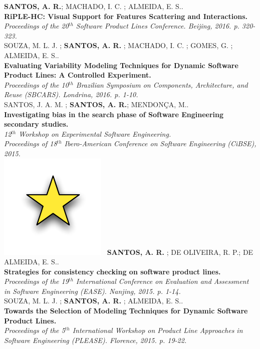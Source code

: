 \documentclass[]{friggeri-cv}
\begin{document}
\textbf{SANTOS, A. R.}; MACHADO, I. C. ; ALMEIDA, E. S..\\
\textbf{RiPLE-HC: Visual Support for Features Scattering and Interactions.} \\
\emph{Proceedings of the 20$^{th}$ Software Product Lines Conference. Beijing, 2016. p. 320-323.}\\

SOUZA, M. L. J. ; \textbf{SANTOS, A. R.} ; MACHADO, I. C. ; GOMES, G. ; ALMEIDA, E. S..\\
\textbf{Evaluating Variability Modeling Techniques for Dynamic Software Product Lines: A Controlled Experiment.} \\
\emph{Proceedings of the 10$^{th}$ Brazilian Symposium on Components, Architecture, and Reuse (SBCARS). Londrina, 2016. p. 1-10.}\\

 SANTOS, J. A. M. ; \textbf{SANTOS, A. R.}; MENDON\c{C}A, M.. \\
 \textbf{Investigating bias in the search phase of Software Engineering secondary studies.} \\
 \emph{12$^{th}$ Workshop on Experimental Software Engineering. \\
     Proceedings of 18$^{th}$ Ibero-American Conference on Software Engineering (CiBSE), 2015.}\\

\includegraphics[scale=.15]{img/star.pdf}~ \textbf{SANTOS, A. R.}  ; DE OLIVEIRA, R. P.; DE ALMEIDA, E. S..\\
 \textbf{Strategies for consistency checking on software product lines.}\\
 \emph{Proceedings of the 19$^{th}$ International Conference on Evaluation and Assessment in Software Engineering (EASE). Nanjing, 2015.  p. 1-14.}\\
 
SOUZA, M. L. J. ; \textbf{SANTOS, A. R.}  ; ALMEIDA, E. S.. \\
 \textbf{Towards the Selection of Modeling Techniques for Dynamic Software Product Lines.} \\
 \emph{Proceedings of the 5$^{th}$ International Workshop on Product Line Approaches in Software Engineering (PLEASE). Florence, 2015. p. 19-22. }\\
 
\end{document}
